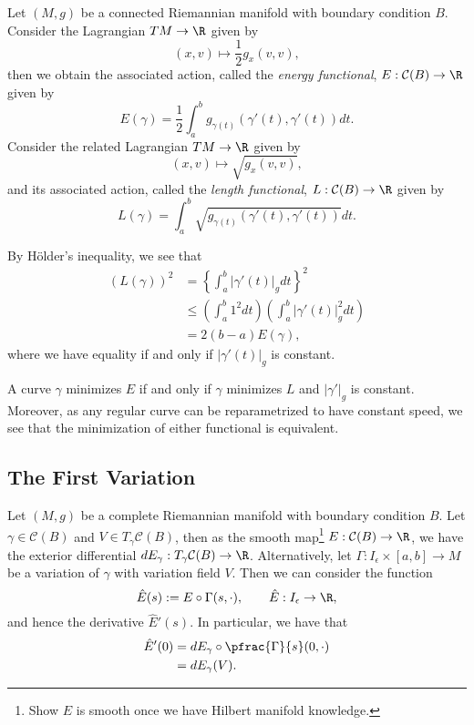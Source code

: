 Let $(M,g)$ be a connected Riemannian manifold with boundary condition $B$.  Consider the Lagrangian $TM\to\R$ given by
$$(x,v)\mapsto\frac{1}{2}g_x(v,v),$$
then we obtain the associated action, called the \textit{energy functional}, $E:\mathcal{C}(B)\to\R$ given by
$$E(\gamma)=\frac{1}{2}\int_a^bg_{\gamma(t)}(\gamma'(t),\gamma'(t))dt.$$
Consider the related Lagrangian $TM\to\R$ given by
$$(x,v)\mapsto\sqrt{g_x(v,v)},$$
and its associated action, called the \textit{length functional}, $L:\mathcal{C}(B)\to\R$ given by
$$L(\gamma)=\int_a^b\sqrt{g_{\gamma(t)}(\gamma'(t),\gamma'(t))}dt.$$

By H\"older's inequality, we see that
\begin{align*}
	\left(L(\gamma)\right)^2&=\left\{\int_a^b|\gamma'(t)|_gdt\right\}^2\\
	&\leq \left(\int_a^b1^2dt\right)\left(\int_a^b|\gamma'(t)|_g^2dt\right)\\
	&=2(b-a)E(\gamma),
\end{align*}
where we have equality if and only if $|\gamma'(t)|_g$ is constant.

\begin{prop}
    A curve $\gamma$ minimizes $E$ if and only if $\gamma$ minimizes $L$ and $|\gamma'|_g$ is constant.  Moreover, as any regular curve can be reparametrized to have constant speed, we see that the minimization of either functional is equivalent.
\end{prop}




\subsection{The First Variation}

Let $(M,g)$ be a complete Riemannian manifold with boundary condition $B$.  Let $\gamma\in\mathcal{C}(B)$ and $V\in T_\gamma\mathcal{C}(B)$, then as the smooth map\footnote{Show $E$ is smooth once we have Hilbert manifold knowledge.} $E:\mathcal{C}(B)\to\R$, we have the exterior differential $dE_\gamma:T_\gamma\mathcal{C}(B)\to\R$.  Alternatively, let $\Gamma:I_\epsilon\times[a,b]\to M$ be a variation of $\gamma$ with variation field $V$.  Then we can consider the function
$$\hat{E}(s):=E\circ\Gamma(s,\cdot),\qquad \hat{E}:I_\epsilon\to\R,$$
and hence the derivative $\hat{E}'(s)$.  In particular, we have that
\begin{align*}
	\hat{E}'(0)&=dE_\gamma\circ\pfrac{\Gamma}{s}(0,\cdot)\\
	&=dE_\gamma(V).
\end{align*}

